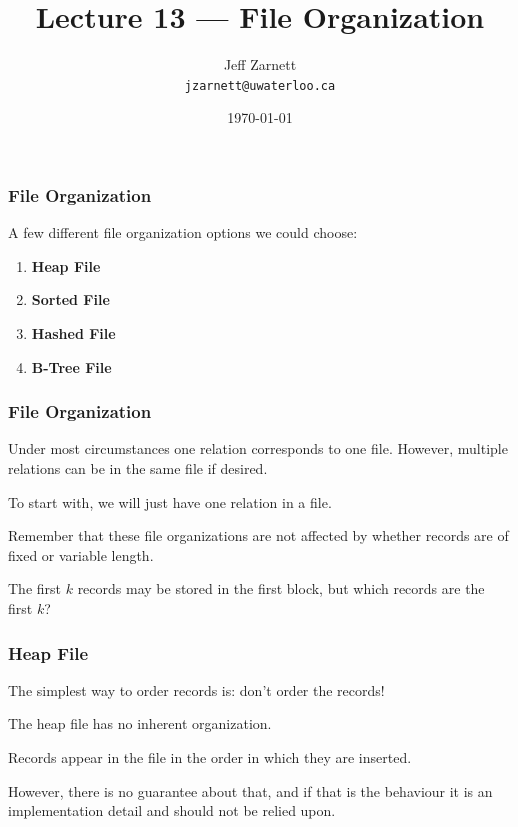

\title{Lecture 13 --- File Organization }

\author{Jeff Zarnett \\ \small \texttt{jzarnett@uwaterloo.ca}}
\date{\today}




\begin{frame}
  \titlepage

 \end{frame}
 
 

\begin{frame}
\frametitle{File Organization}

A few different file organization options we could choose:

\begin{enumerate}
	\item \textbf{Heap File}
	\item \textbf{Sorted File}
	\item \textbf{Hashed File}
	\item \textbf{B-Tree File}
\end{enumerate}

\end{frame}



\begin{frame}
\frametitle{File Organization}

Under most circumstances one relation corresponds to one file. However, multiple relations can be in the same file if desired. 

To start with, we will just have one relation in a file. 

Remember that these file organizations are not affected by whether records are of fixed or variable length.

The first $k$ records may be stored in the first block, but which records are the first $k$?

\end{frame}


\begin{frame}
\frametitle{Heap File}

The simplest way to order records is: don't order the records! 

The heap file has no inherent organization. 

Records appear in the file in the order in which they are inserted. 

However, there is no guarantee about that, and if that is the behaviour it is an implementation detail and should not be relied upon. 

\end{frame}


